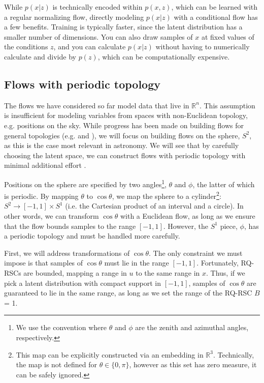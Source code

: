 \documentclass[twocolumn,twocolappendix,linenumbers]{aastex631}
\newcommand{\R}{\mathbb{R}}
\begin{document}
While $p(x|z)$ is technically encoded within $p(x,z)$, which can be learned with a regular normalizing flow, directly modeling $p(x|z)$ with a conditional flow has a few benefits.
Training is typically faster, since the latent distribution has a smaller number of dimensions.
You can also draw samples of $x$ at fixed values of the conditions $z$, and you can calculate $p(x|z)$ without having to numerically calculate and divide by $p(z)$, which can be computationally expensive.

\subsection{Flows with periodic topology}
\label{sec:periodic}

The flows we have considered so far model data that live in $\R^n$.
This assumption is insufficient for modeling variables from spaces with non-Euclidean topology, e.g. positions on the sky.
While progress has been made on building flows for general topologies (e.g. \citealt{gemici2016} and \citealt{falorsi2019}), we will focus on building flows on the sphere, $S^2$, as this is the case most relevant in astronomy.
We will see that by carefully choosing the latent space, we can construct flows with periodic topology with minimal additional effort \citep{rezende2020}.

Positions on the sphere are specified by two angles\footnote{
We use the convention where $\theta$ and $\phi$ are the zenith and azimuthal angles, respectively.
},
$\theta$ and $\phi$, the latter of which is periodic.
By mapping $\theta$ to $\cos\theta$, we map the sphere to a cylinder\footnote{
This map can be explicitly constructed via an embedding in $\R^3$.
Technically, the map is not defined for $\theta \in \{0, \pi\}$, however as this set has zero measure, it can be safely ignored.}:
$S^2 \to [-1,1] \times S^1$ (i.e. the Cartesian product of an interval and a circle).
In other words, we can transform $\cos\theta$ with a Euclidean flow, as long as we ensure that the flow bounds samples to the range $[-1, 1]$.
However, the $S^1$ piece, $\phi$, has a periodic topology and must be handled more carefully.

First, we will address transformations of $\cos\theta$.
The only constraint we must impose is that samples of $\cos\theta$ must lie in the range $[-1, 1]$.
Fortunately, RQ-RSCs are bounded, mapping a range in $u$ to the same range in $x$.
Thus, if we pick a latent distribution with compact support in $[-1, 1]$, samples of $\cos\theta$ are guaranteed to lie in the same range, as long as we set the range of the RQ-RSC $B$ = 1.
\end{document}
